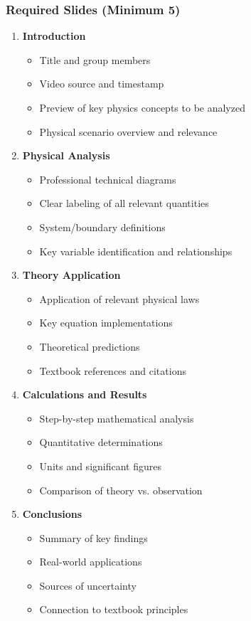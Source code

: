 \documentclass[12pt]{article}
\begin{document}
\subsubsection{Required Slides (Minimum 5)}
\begin{enumerate}[label=\textbf{Slide \arabic*.}]
\item \textbf{Introduction}
\begin{itemize}
\item Title and group members
\item Video source and timestamp
\item Preview of key physics concepts to be analyzed
\item Physical scenario overview and relevance
\end{itemize}
\item \textbf{Physical Analysis}
\begin{itemize}
\item Professional technical diagrams
\item Clear labeling of all relevant quantities
\item System/boundary definitions
\item Key variable identification and relationships
\end{itemize}
\item \textbf{Theory Application}
\begin{itemize}
\item Application of relevant physical laws
\item Key equation implementations
\item Theoretical predictions
\item Textbook references and citations
\end{itemize}
\item \textbf{Calculations and Results}
\begin{itemize}
\item Step-by-step mathematical analysis
\item Quantitative determinations
\item Units and significant figures
\item Comparison of theory vs. observation
\end{itemize}
\item \textbf{Conclusions}
\begin{itemize}
\item Summary of key findings
\item Real-world applications
\item Sources of uncertainty
\item Connection to textbook principles
\end{itemize}
\end{enumerate}
\end{document}
